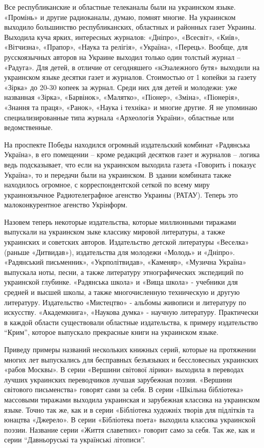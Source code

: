 Все республиканские и областные телеканалы были на украинском языке. «Промінь»
и другие радиоканалы, думаю, помнят многие. На украинском выходило большинство
республиканских, областных и районных газет Украины. Выходила куча ярких,
интересных журналов: «Дніпро», «Всесвіт», «Київ», «Вітчизна», «Прапор», «Наука
та релігія», «Україна», «Перець». Вообще, для русскоязычных авторов на Украине
выходил только один толстый журнал – «Радуга». Для детей, в отличие от
сегодняшего «нЭзалежного бутя» выходили на украинском языке десятки газет и
журналов. Стоимостью от 1 копейки за газету «Зірка» до 20-30 копеек за журнал.
Среди них для детей и молодежи: уже названная «Зірка», «Барвінок», «Малятко»,
«Піонер», «Зміна», «Піонерія», «Знання та праця», «Ранок», «Наука і техніка» и
многие другие. Я не упоминаю специализированные типа журнала «Археологія
України», областные или ведомственные.

На проспекте Победы находился огромный издательский комбинат «Радянська
Україна», в его помещении – кроме редакций десятков газет и журналов – логика
ведь подсказывает, что если на украинском выходила газета «Говорить і показує
Україна», то и передачи были на украинском. В здании комбината также находилось
огромное, с корреспондентской сеткой по всему миру украиноязычное
Радиотелеграфное агенство Украины (РАТАУ). Теперь это малоконкурентное агенство
Укрінформ.

Назовем теперь некоторые издательства, которые миллионными тиражами выпускали
на украинском зыке классику мировой литературы, а также украинских и советских
авторов. Издательство детской литературы «Веселка» (раньше «Дитвидав»),
издательства для молодежи «Молодь» и «Дніпро». «Радянський письменник»,
«Укрполітвидав», «Каменяр», «Музична Україна» выпускала ноты, песни, а также
литературу этнографических экспедиций по украинской глубинке. «Радянська школа»
и «Вища школа» - учебники для средней и высшей школы, а также многочисленную
техническую и другую литературу. Издательство «Мистецтво» - альбомы живописи и
литературу по искусству. «Академкнига», «Наукова думка» - научную литературу.
Практически в каждой области существовали областные издательства, к примеру
издательство \enquote{Крим}, которое выпускало прекрасные книги на украинском языке.

Приведу примеры названий нескольких книжных серий, которые на протяжении многих
лет выпускались для бесправных безъязыких и бессловесных украинских «рабов
Москвы». В серии «Вершини світової лірики» выходила в переводах лучших
украинских переводчиков лучшая зарубежная поэзия. «Вершини світового
письменства» говорят сами за себя. В серии «Шкільна бібліотека» массовыми
тиражами выходила украинская и зарубежная классика на украинском языке. Точно
так же, как и в серии «Бібліотека художніх творів для підлітків та юнацтва
«Джерело». В серии «Бібліотека поета» выходила классика украинской поэзии.
Название серии «Життя славетних» говорит само за себя. Так же, как и серии
\enquote{Давньоруські та українські літописи}.

